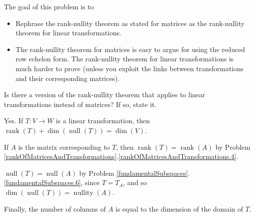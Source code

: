 \documentclass{problemset}
\DeclareMathOperator{\Rank}{rank}
\DeclareMathOperator{\Null}{null}
\DeclareMathOperator{\Nullity}{nullity}
\DeclareMathOperator{\Dim}{dim}
\begin{document}
	\question
	\begin{annotation}
		\begin{goals}

			The goal of this problem is to
			\begin{itemize}
				\item Rephrase the rank-nullity theorem as stated for matrices as
					the rank-nullity theorem for linear transformations.
			\end{itemize}
		\end{goals}

		\begin{notes}
			\begin{itemize}
				\item The rank-nullity theorem for matrices is easy to argue for using
					the reduced row echelon form. The rank-nullity theorem for 
					linear transformations is much harder to prove (unless you exploit
					the links between transformations and their corresponding matrices).
			\end{itemize}
		\end{notes}
	\end{annotation}
	\begin{parts}
		\item Is there a version of the rank-nullity theorem that applies to linear
			transformations instead of matrices? If so, state it.
			\begin{solution}
				Yes. If $T:V\to W$ is a linear transformation, then
				$\Rank(T)+\Dim(\Null(T))=\Dim(V)$.

				If $A$ is the matrix corresponding to $T$, then $\Rank(T)=\Rank(A)$
				by Problem \ref{rankOfMatricesAndTransformations}.\ref{rankOfMatricesAndTransformations.4}.

				$\Null(T)=\Null(A)$ by Problem \ref{fundamentalSubspaces}.\ref{fundamentalSubspaces.6},
				since $T=T_A$, and so $\Dim(\Null(T))=\Nullity(A)$.

				Finally, the number of columns of $A$ is equal to the dimension
				of the domain of $T$.
			\end{solution}
	\end{parts}
\end{document}
